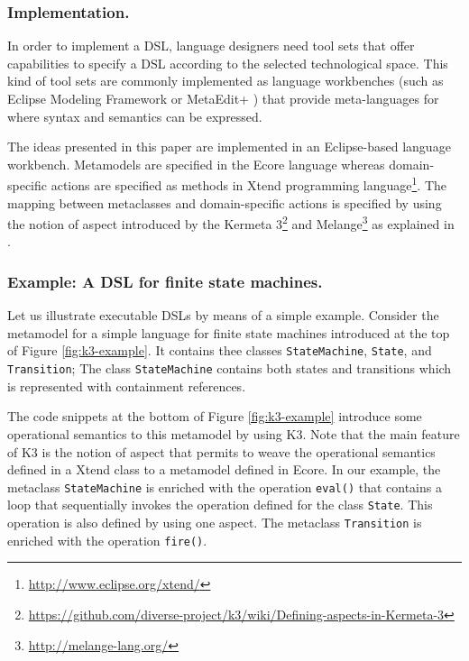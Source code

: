 \subsubsection{Implementation.} In order to implement a DSL, language designers need tool sets that offer capabilities to specify a DSL according to the selected technological space. This kind of tool sets are commonly implemented as language workbenches (such as Eclipse Modeling Framework \cite{Steinberg:2009} or MetaEdit+ \cite{Kelly:2013}) that provide meta-languages for where syntax and semantics can be expressed.

The ideas presented in this paper are implemented in an Eclipse-based language workbench. Metamodels are specified in the Ecore language whereas domain-specific actions are specified as methods in Xtend programming language\footnote{\url{http://www.eclipse.org/xtend/}}. The mapping between metaclasses and domain-specific actions is specified by using the notion of aspect introduced by the Kermeta 3\footnote{\url{https://github.com/diverse-project/k3/wiki/Defining-aspects-in-Kermeta-3}} and Melange\footnote{\url{http://melange-lang.org/}} as explained in \cite{degueule:2015}. 

\vspace{-3mm}
\subsubsection{Example: A DSL for finite state machines.} Let us illustrate executable DSLs by means of a simple example. Consider the metamodel for a simple language for finite state machines introduced at the top of Figure \ref{fig:k3-example}. It contains thee classes \texttt{StateMachine}, \texttt{State}, and \texttt{Transition}; The class \texttt{StateMachine} contains both states and transitions which is represented with containment references.

The code snippets at the bottom of Figure \ref{fig:k3-example} introduce some operational semantics to this metamodel by using K3. Note that the main feature of K3 is the notion of aspect that permits to weave the operational semantics defined in a Xtend class to a metamodel defined in Ecore. In our example, the metaclass \texttt{StateMachine} is enriched with the operation \texttt{eval()} that contains a loop that sequentially invokes the operation defined for the class \texttt{State}. This operation is also defined by using one aspect. The metaclass \texttt{Transition} is enriched with the operation \texttt{fire()}.

